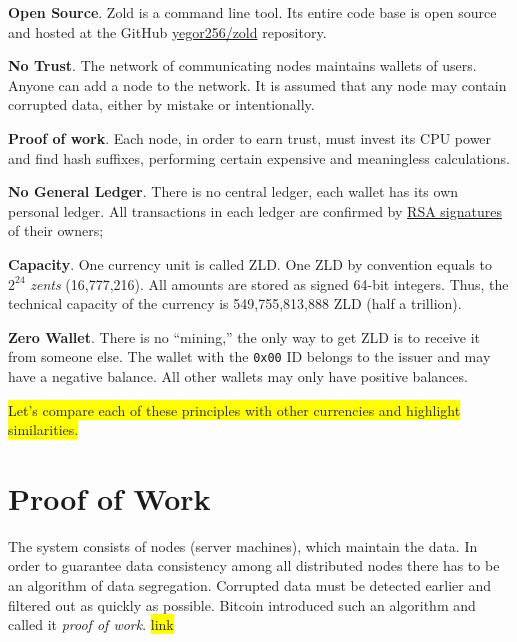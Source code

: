 \documentclass[11pt,oneside]{article}
\newcommand\dd[1]{\colorbox{gray!30}{\texttt{#1}}}
\begin{document}
\textbf{Open Source}.
Zold is a command line tool. Its entire code base is open source
and hosted at the GitHub \href{https://github.com/yegor256/zold}{yegor256/zold}
repository.

\textbf{No Trust}.
The network of communicating nodes maintains wallets of users.
Anyone can add a node to the network.
It is assumed that any node may contain corrupted data, either by mistake or intentionally.

\textbf{Proof of work}.
Each node, in order to earn trust, must invest its CPU power
and find hash suffixes, performing certain expensive and meaningless calculations.

\textbf{No General Ledger}.
There is no central ledger, each wallet has its own personal ledger.
All transactions in each ledger are confirmed by
\href{https://en.wikipedia.org/wiki/RSA_(cryptosystem)}{RSA signatures}
of their owners;

\textbf{Capacity}.
One currency unit is called ZLD.
One ZLD by convention equals to $2^{24}$ \emph{zents} (16,777,216).
All amounts are stored as signed 64-bit integers.
Thus, the technical capacity of the currency is 549,755,813,888 ZLD (half a trillion).

\textbf{Zero Wallet}.
There is no ``mining,'' the only way to get ZLD is to receive it from someone else.
The wallet with the \dd{0x00} ID belongs to the
issuer and may have a negative balance. All other wallets
may only have positive balances.

\colorbox{yellow}{Let's compare each of these principles with other currencies and highlight similarities.}

\section{Proof of Work}

The system consists of nodes (server machines), which maintain the data.
In order to guarantee data consistency among all distributed nodes
there has to be an algorithm of data segregation.
Corrupted data must be detected earlier and filtered out as quickly as possible.
Bitcoin introduced such an algorithm and called it \emph{proof of work}.
\colorbox{yellow}{link}
\end{document}
